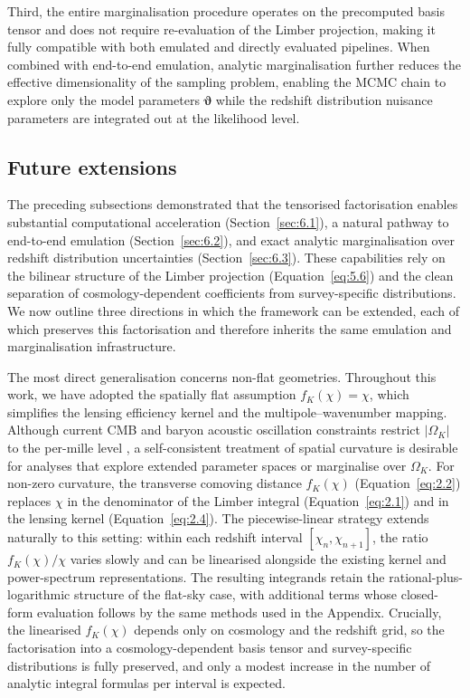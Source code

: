 Third, the entire marginalisation procedure operates on the precomputed basis tensor and does not require re-evaluation of the Limber projection, making it fully compatible with both emulated and directly evaluated pipelines. When combined with end-to-end emulation, analytic marginalisation further reduces the effective dimensionality of the sampling problem, enabling the MCMC chain to explore only the model parameters \(\boldsymbol{\vartheta}\) while the redshift distribution nuisance parameters are integrated out at the likelihood level.

\subsection{Future extensions} \label{sec:6.4}

The preceding subsections demonstrated that the tensorised factorisation enables substantial computational acceleration (Section~\ref{sec:6.1}), a natural pathway to end-to-end emulation (Section~\ref{sec:6.2}), and exact analytic marginalisation over redshift distribution uncertainties (Section~\ref{sec:6.3}). These capabilities rely on the bilinear structure of the Limber projection (Equation~\ref{eq:5.6}) and the clean separation of cosmology-dependent coefficients from survey-specific distributions. We now outline three directions in which the framework can be extended, each of which preserves this factorisation and therefore inherits the same emulation and marginalisation infrastructure.

The most direct generalisation concerns non-flat geometries. Throughout this work, we have adopted the spatially flat assumption \(f_K(\chi) = \chi\), which simplifies the lensing efficiency kernel and the multipole--wavenumber mapping. Although current CMB and baryon acoustic oscillation constraints restrict \(|\Omega_K|\) to the per-mille level \citep{2020A&A...641A...6P}, a self-consistent treatment of spatial curvature is desirable for analyses that explore extended parameter spaces or marginalise over \(\Omega_K\). For non-zero curvature, the transverse comoving distance \(f_K(\chi)\) (Equation~\ref{eq:2.2}) replaces \(\chi\) in the denominator of the Limber integral (Equation~\ref{eq:2.1}) and in the lensing kernel (Equation~\ref{eq:2.4}). The piecewise-linear strategy extends naturally to this setting: within each redshift interval \([\chi_n, \chi_{n+1}]\), the ratio \(f_K(\chi)/\chi\) varies slowly and can be linearised alongside the existing kernel and power-spectrum representations. The resulting integrands retain the rational-plus-logarithmic structure of the flat-sky case, with additional terms whose closed-form evaluation follows by the same methods used in the Appendix. Crucially, the linearised \(f_K(\chi)\) depends only on cosmology and the redshift grid, so the factorisation into a cosmology-dependent basis tensor and survey-specific distributions is fully preserved, and only a modest increase in the number of analytic integral formulas per interval is expected.

